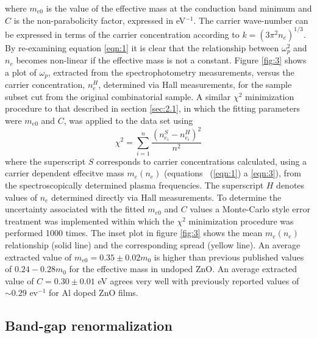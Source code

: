 \documentclass[final,5p,times]{elsarticle}
\begin{document}
where $m_{e0}$ is the value of the effective mass at the conduction band minimum and $C$ is the non-parabolicity factor, expressed in eV$^{-1}$. The carrier wave-number can be expressed in terms of the carrier concentration according to $k = (3\pi^2n_e)^{1/3}$. By re-examining equation \ref{eqn:1} it is clear that the relationship between $\omega_p^2$ and $n_e$ becomes non-linear if the effective mass is not a constant. Figure \ref{fig:3} shows a plot of $\omega_{p}$, extracted from the spectrophotometry measurements, versus the carrier concentration, $n_e^H$, determined via Hall measurements, for the sample subset cut from the original combinatorial sample. A similar $\chi^2$ minimization procedure to that described in section \ref{sec:2.1}, in which the fitting parameters were $m_{e0}$ and $C$, was applied to the data set using
\begin{equation}\label{eqn:4}
\chi^2 = \sum_{i=1}^n\frac{(n_{e_i}^S-n_{e_i}^H)^2}{n^2}
\end{equation}
where the superscript $S$ corresponds to carrier concentrations calculated, using a carrier dependent effecitve mass $m_e(n_e)$ (equations ~(\ref{eqn:1}) a \ref{eqn:3}), from the spectroscopically determined plasma frequencies. The superscript $H$ denotes values of $n_e$ determined directly via Hall measurements. To determine the uncertainty associated with the fitted $m_{e0}$ and $C$ values a Monte-Carlo style error treatment \cite{Mendelsberg2009} was implemented within which the $\chi^2$ minimization procedure was performed 1000 times. The inset plot in figure \ref{fig:3} shows the mean $m_e(n_e)$ relationship (solid line) and the corresponding spread (yellow line). An average extracted value of $m_{e0} = 0.35\pm0.02m_0$ is higher than previous published values of $0.24 - 0.28 m_0$ for the effective mass in undoped ZnO. An average extracted value of $C=0.30\pm0.01$ eV agrees very well with previously reported values of $\sim0.29$ ev$^{-1}$ \cite{Ruske2009, Ellmer2001} for Al doped ZnO films.

\subsection{ Band-gap renormalization}
\label{sec:2.3}
\end{document}
